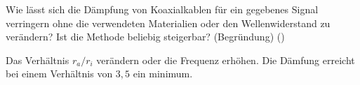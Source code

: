 \begin{question}[section=7,name={Dämfung von Koaxialkablen},difficulty=,quantity=,type=thr,tags={20160310}]
	Wie lässt sich die Dämpfung von Koaxialkablen für ein gegebenes Signal verringern ohne die verwendeten Materialien oder den Wellenwiderstand zu verändern? Ist die Methode beliebig steigerbar? (Begründung) ()
	
\end{question}
\begin{solution}
	Das Verhältnis $r_a/r_i$ verändern oder die Frequenz erhöhen. Die Dämfung erreicht bei einem Verhältnis von $3,5$ ein minimum.
\end{solution}